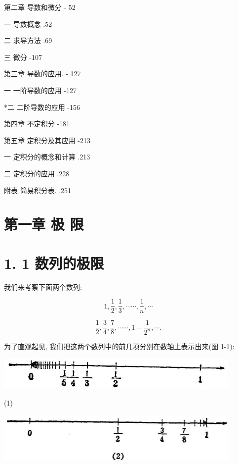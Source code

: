 \documentclass[10pt]{article}
\begin{document}
第二章 导数和微分 - 52

一 导数概念 .52

二 求导方法 .69

三 微分 -107

第三章 导数的应用. - 127

一 一阶导数的应用 -127

*二 二阶导数的应用 -156

第四章 不定积分 -181

第五章 定积分及其应用 -213

一 定积分的概念和计算 .213

二 定积分的应用 .228

附表 简易积分表. .251

\section*{第一章 极 限}

\section*{1. 1 数列的极限}

我们来考察下面两个数列:

\[
1,\frac{1}{2},\frac{1}{3},\cdots \cdots ,\frac{1}{n},\cdots \tag{1}
\]

\[
\frac{1}{2},\frac{3}{4},\frac{7}{8},\cdots \cdots ,1 - \frac{1}{{2}^{n}},\cdots \text{.} \tag{2}
\]

为了直观起见, 我们把这两个数列中的前几项分别在数轴上表示出来(图 1-1):

\begin{center}
\includegraphics[max width=0.9\textwidth]{images/01912c18-5c3f-733d-b775-749ba9897a9d_4_159408.jpg}
\end{center}

(1)

\begin{center}
\includegraphics[max width=0.9\textwidth]{images/01912c18-5c3f-733d-b775-749ba9897a9d_4_459236.jpg}
\end{center}
\end{document}
